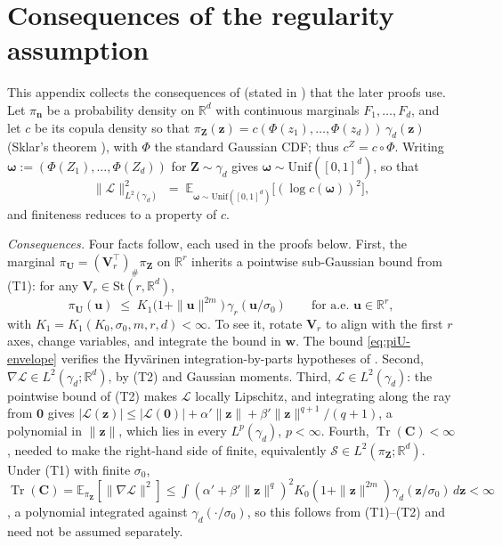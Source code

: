 \documentclass[review,hidelinks,onefignum,onetabnum]{siamart251216}
\newcommand{\RR}{\mathbb{R}}
\newcommand{\EE}{\mathbb{E}}
\newcommand{\tr}{\operatorname{Tr}}
\newcommand{\gauss}{\gamma}
\newcommand{\mC}{\bm{C}}
\newcommand{\mV}{\bm{V}}
\newcommand{\St}{\mathrm{St}}
\newcommand{\vn}{\bm{n}}
\newcommand{\vz}{\bm{z}}
\newcommand{\vZ}{\bm{Z}}
\newcommand{\vu}{\bm{u}}
\newcommand{\vU}{\bm{U}}
\newcommand{\vw}{\bm{w}}
\newcommand{\scL}{\mathcal{L}}
\newcommand{\scS}{\mathcal{S}}
\begin{document}
\section{Consequences of the regularity assumption}
\label{app:regularity}

This appendix collects the consequences of  (stated in ) that the later proofs use. Let $\pi_{\vn}$ be a probability density on $\RR^d$ with continuous marginals $F_1, \ldots, F_d$, and let $c$ be its copula density so that $\pi_{\vZ}(\vz) = c(\Phi(z_1), \ldots, \Phi(z_d))\,\gauss_d(\vz)$ (Sklar's theorem \cite{Sklar1959, Nelsen2006book}), with $\Phi$ the standard Gaussian CDF; thus $c^{Z} = c\circ\Phi$. Writing $\bm\omega := (\Phi(Z_1), \ldots, \Phi(Z_d))$ for $\vZ \sim \gauss_d$ gives $\bm\omega \sim \mathrm{Unif}([0,1]^d)$, so that
\begin{equation}
  \|\scL\|_{L^2(\gauss_d)}^2 \;=\; \EE_{\bm\omega \sim \mathrm{Unif}([0,1]^d)}\bigl[(\log c(\bm\omega))^2\bigr],
  \label{eq:L2-g-copula}
\end{equation}
and finiteness reduces to a property of $c$.

\emph{Consequences.} Four facts follow, each used in the proofs below. First, the marginal $\pi_{\vU} = (\mV_r^\top)_\#\pi_{\vZ}$ on $\RR^r$ inherits a pointwise sub-Gaussian bound from (T1): for any $\mV_r \in \St(r,\RR^d)$,
\begin{equation}
  \pi_{\vU}(\vu) \;\le\; K_1\bigl(1+\|\vu\|^{2m}\bigr)\,\gauss_r(\vu/\sigma_0)
  \qquad\text{for a.e.\ } \vu \in \RR^r,
  \label{eq:piU-envelope}
\end{equation}
with $K_1 = K_1(K_0, \sigma_0, m, r, d) < \infty$. To see it, rotate $\mV_r$ to align with the first $r$ axes, change variables, and integrate the bound in $\vw$. The bound \eqref{eq:piU-envelope} verifies the Hyv\"arinen integration-by-parts hypotheses of . Second, $\nabla\scL \in L^2(\gauss_d;\RR^d)$, by (T2) and Gaussian moments. Third, $\scL \in L^2(\gauss_d)$: the pointwise bound of (T2) makes $\scL$ locally Lipschitz, and integrating along the ray from $\bm 0$ gives $|\scL(\vz)| \le |\scL(\bm 0)| + \alpha'\|\vz\| + \beta'\|\vz\|^{q+1}/(q+1)$, a polynomial in $\|\vz\|$, which lies in every $L^p(\gauss_d)$, $p<\infty$. Fourth, $\tr(\mC)<\infty$, needed to make the right-hand side of  finite, equivalently $\scS \in L^2(\pi_{\vZ};\RR^d)$. Under (T1) with finite $\sigma_0$, $\tr(\mC)=\EE_{\pi_{\vZ}}[\|\nabla\scL\|^2] \le \int(\alpha'+\beta'\|\vz\|^q)^2 K_0(1+\|\vz\|^{2m})\gauss_d(\vz/\sigma_0)\,d\vz<\infty$, a polynomial integrated against $\gauss_d(\cdot/\sigma_0)$, so this follows from (T1)--(T2) and need not be assumed separately.
\end{document}
